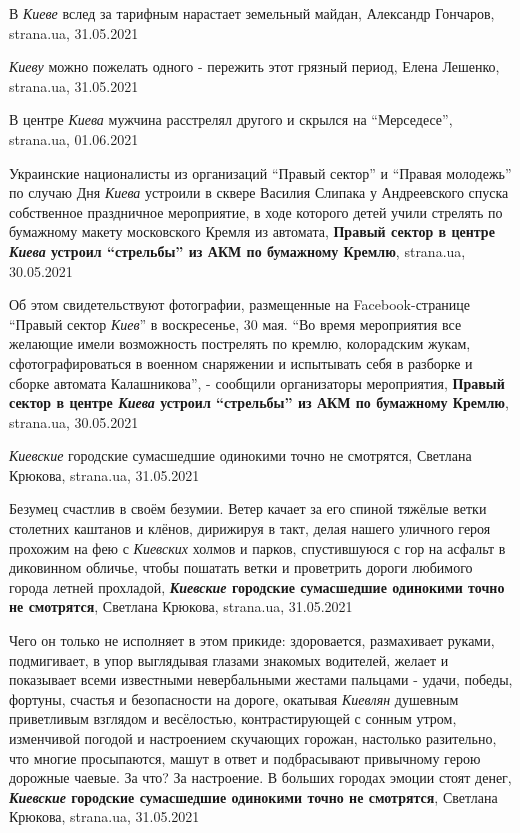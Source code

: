 В \emph{Киеве} вслед за тарифным нарастает земельный майдан, Александр
Гончаров, strana.ua, 31.05.2021

\emph{Киеву} можно пожелать одного - пережить этот грязный период, Елена
Лешенко, strana.ua, 31.05.2021

В центре \emph{Киева} мужчина расстрелял другого и скрылся на \enquote{Мерседесе}, strana.ua, 01.06.2021

Украинские националисты из организаций \enquote{Правый сектор} и
\enquote{Правая молодежь} по случаю Дня \emph{Киева} устроили в сквере Василия
Слипака у Андреевского спуска собственное праздничное мероприятие, в ходе
которого детей учили стрелять по бумажному макету московского Кремля из
автомата, \textbf{Правый сектор в центре \emph{Киева} устроил
\enquote{стрельбы} из АКМ по бумажному Кремлю}, strana.ua, 30.05.2021

Об этом свидетельствуют фотографии, размещенные на Facebook-странице
\enquote{Правый сектор \emph{Киев}} в воскресенье, 30 мая.  \enquote{Во время
мероприятия все желающие имели возможность пострелять по кремлю, колорадским
жукам, сфотографироваться в военном снаряжении и испытывать себя в разборке и
сборке автомата Калашникова}, - сообщили организаторы мероприятия,
\textbf{Правый сектор в центре \emph{Киева} устроил \enquote{стрельбы} из АКМ
по бумажному Кремлю}, strana.ua, 30.05.2021

\emph{Киевские} городские сумасшедшие одинокими точно не смотрятся, Светлана
Крюкова, strana.ua, 31.05.2021

Безумец счастлив в своём безумии. Ветер качает за его спиной тяжёлые ветки
столетних каштанов и клёнов, дирижируя в такт, делая нашего уличного героя
прохожим на фею с \emph{Киевских} холмов и парков, спустившуюся с гор на
асфальт в диковинном обличье, чтобы пошатать ветки и проветрить дороги любимого
города летней прохладой, \textbf{\emph{Киевские} городские сумасшедшие
одинокими точно не смотрятся}, Светлана Крюкова, strana.ua, 31.05.2021

Чего он только не исполняет в этом прикиде: здоровается, размахивает руками,
подмигивает, в упор выглядывая глазами знакомых водителей, желает и показывает
всеми известными невербальными жестами пальцами - удачи, победы, фортуны,
счастья и безопасности на дороге, окатывая \emph{Киевлян} душевным приветливым
взглядом и весёлостью, контрастирующей с сонным утром, изменчивой погодой и
настроением скучающих горожан, настолько разительно, что многие просыпаются,
машут в ответ и подбрасывают привычному герою дорожные чаевые. За что? За
настроение. В больших городах эмоции стоят денег, \textbf{\emph{Киевские}
городские сумасшедшие одинокими точно не смотрятся}, Светлана Крюкова,
strana.ua, 31.05.2021

